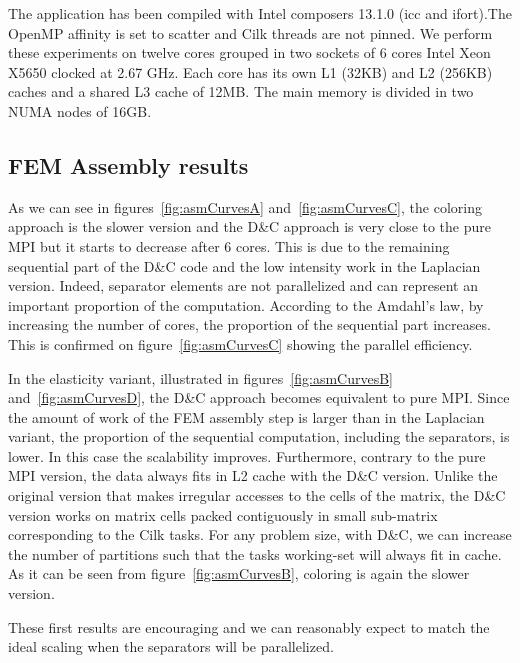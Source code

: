 \documentclass{IOS-Book-Article}
\begin{document}
The application has been compiled with Intel composers 13.1.0 (icc and ifort).The OpenMP affinity is set to scatter and Cilk threads are not pinned.
We perform these experiments on twelve cores grouped in two sockets of 6 cores Intel Xeon X5650 clocked at 2.67 GHz.
Each core has its own L1 (32KB) and L2 (256KB) caches and a shared L3 cache of 12MB. The main memory is divided in two NUMA nodes of 16GB.


\subsection{FEM Assembly results}
As we can see in figures~\ref{fig:asmCurvesA} and~\ref{fig:asmCurvesC}, the coloring approach is the slower version and the D\&C approach is very close to the pure MPI but it starts to decrease after 6 cores. 
This is due to the remaining sequential part of the D\&C code and the low intensity work in the Laplacian version.
Indeed, separator elements are not parallelized and can represent an important proportion of the computation.
According to the Amdahl's law, by increasing the number of cores, the proportion of the sequential part increases.
This is confirmed on figure~\ref{fig:asmCurvesC} showing the parallel efficiency.

In the elasticity variant, illustrated in figures~\ref{fig:asmCurvesB} and~\ref{fig:asmCurvesD}, the D\&C approach becomes equivalent to pure MPI.
Since the amount of work of the FEM assembly step is larger than in the Laplacian variant, the proportion of the sequential computation, including the separators, is lower.
In this case the scalability improves. Furthermore, contrary to the pure MPI version, the data always fits in L2 cache with the D\&C version.
Unlike the original version that makes irregular accesses to the cells of the matrix, the D\&C version works on matrix cells packed contiguously in small sub-matrix corresponding to the Cilk tasks.
For any problem size, with D\&C, we can increase the number of partitions such that the tasks working-set will always fit in cache.
As it can be seen from figure~\ref{fig:asmCurvesB}, coloring is again the slower version.

These first results are encouraging and we can reasonably expect to match the ideal scaling when the separators will be parallelized.
\end{document}
